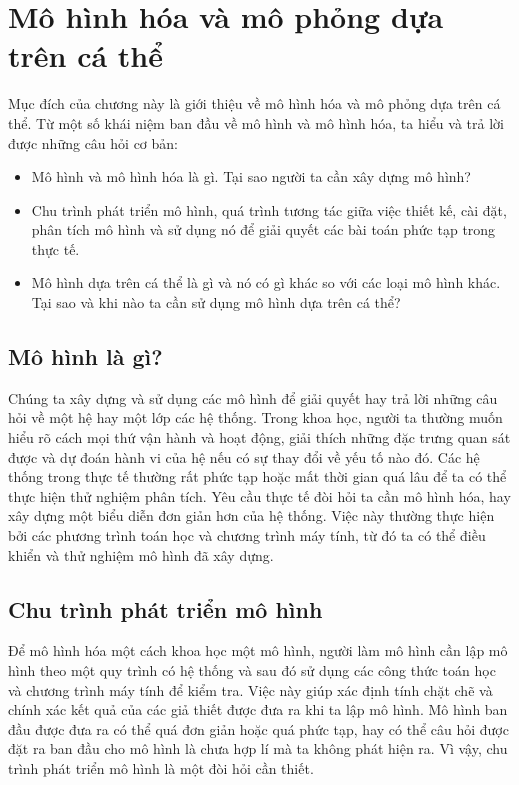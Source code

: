 \documentclass[13pt]{extreport}
\begin{document}
\section{Mô hình hóa và mô phỏng dựa trên cá thể}
Mục đích của chương này là giới thiệu về mô hình hóa và mô phỏng dựa trên cá thể. Từ một số khái niệm ban đầu về mô hình và mô hình hóa, ta hiểu và trả lời được những câu hỏi cơ bản:
\begin{itemize}
\item Mô hình và mô hình hóa là gì. Tại sao người ta cần xây dựng mô hình?
\item Chu trình phát triển mô hình, quá trình tương tác giữa việc thiết kế, cài đặt, phân tích mô hình và sử dụng nó để giải quyết các bài toán phức tạp trong thực tế.
\item Mô hình dựa trên cá thể là gì và nó có gì khác so với các loại mô hình khác. Tại sao và khi nào ta cần sử dụng mô hình dựa trên cá thể?
\end{itemize}

\subsection{Mô hình là gì?}
 Chúng ta xây dựng và sử dụng các mô hình để giải quyết hay trả lời những câu hỏi về một hệ hay một lớp các hệ thống. Trong khoa học, người ta thường muốn hiểu rõ cách mọi thứ vận hành và hoạt động, giải thích những đặc trưng quan sát được và dự đoán hành vi của hệ nếu có sự thay đổi về yếu tố nào đó. Các hệ thống trong thực tế thường rất phức tạp hoặc mất thời gian quá lâu để ta có thể thực hiện thử nghiệm phân tích. Yêu cầu thực tế đòi hỏi ta cần mô hình hóa, hay xây dựng một biểu diễn đơn giản hơn của hệ thống. Việc này thường thực hiện bởi các phương trình toán học và chương trình máy tính, từ đó ta có thể điều khiển và thử nghiệm mô hình đã xây dựng.


\subsection{Chu trình phát triển mô hình}
\indent Để mô hình hóa một cách khoa học một mô hình, người làm mô hình cần lập mô hình theo một quy trình có hệ thống và sau đó sử dụng các công thức toán học và chương trình máy tính để kiểm tra. Việc này giúp xác định tính chặt chẽ và chính xác kết quả của các giả thiết được đưa ra khi ta lập mô hình. Mô hình ban đầu được đưa ra có thể quá đơn giản hoặc quá phức tạp, hay có thể câu hỏi được đặt ra ban đầu cho mô hình là chưa hợp lí mà ta không phát hiện ra. Vì vậy, chu trình phát triển mô hình là một đòi hỏi cần thiết.
\end{document}
